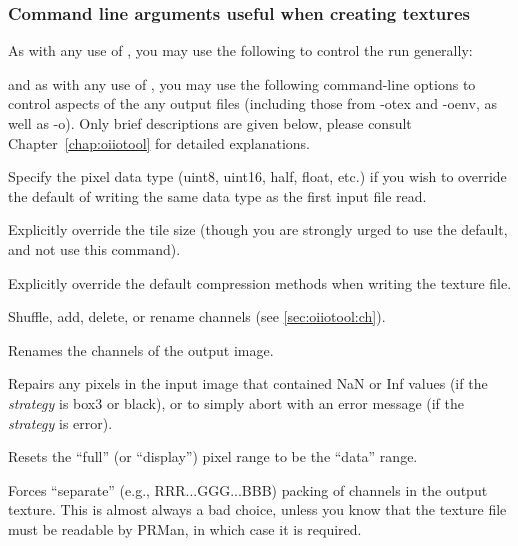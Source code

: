 \subsubsection*{Command line arguments useful when creating textures}

As with any use of \oiiotool, you may use the following to control the
run generally:

\apiend

\noindent and as with any use of \oiiotool, you may use the following
command-line options to control aspects of the any output files (including
those from {\cf -otex} and {\cf -oenv}, as well as {\cf -o}). Only brief
descriptions are given below, please consult Chapter~\ref{chap:oiiotool} for
detailed explanations.

Specify the pixel data type ({\cf uint8}, {\cf uint16}, {\cf half}, {\cf float},
etc.) if you wish to override the default of writing the same data type as
the first input file read.
\apiend

Explicitly override the tile size (though you are strongly urged to use
the default, and not use this command).
\apiend

Explicitly override the default compression methods when writing
the texture file.
\apiend

Shuffle, add, delete, or rename channels (see \ref{sec:oiiotool:ch}).
\apiend

Renames the channels of the output image.
\apiend

Repairs any pixels in the input image that contained {\cf NaN} or 
{\cf Inf} values (if the \emph{strategy} is {\cf box3} or {\cf black}),
or to simply abort with an error message (if the \emph{strategy} is {\cf error}).
\apiend

Resets the ``full'' (or ``display'') pixel range to be the ``data'' range.
\apiend

Forces ``separate'' (e.g., RRR...GGG...BBB) packing of channels in the
output texture.  This is almost always a bad choice, unless you know that
the texture file must be readable by PRMan, in which case it is required.
\apiend

